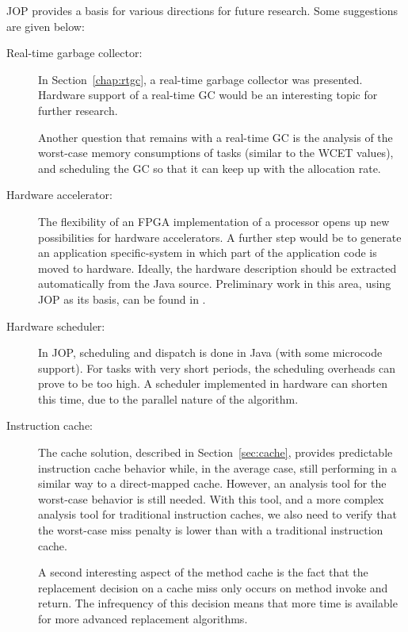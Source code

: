 JOP provides a basis for various directions for future research.
Some suggestions are given below:
%
\begin{description}
    \item[Real-time garbage collector:]
In Section~\ref{chap:rtgc}, a real-time garbage collector was
presented. Hardware support of a real-time GC would be an
interesting topic for further research.

Another question that remains with a real-time GC is the analysis of
the worst-case memory consumptions of tasks (similar to the WCET
values), and scheduling the GC so that it can keep up with the
allocation rate.

    \item[Hardware accelerator:] The flexibility of an FPGA
        implementation of a processor opens up new possibilities
        for hardware accelerators. A further step would be to
        generate an application specific-system in which part of
        the application code is moved to hardware. Ideally, the
        hardware description should be extracted automatically
        from the Java source. Preliminary work in this area,
        using JOP as its basis, can be found in \cite{jop:sac05,
        jop:hwmethods}.

    \item[Hardware scheduler:]
In JOP, scheduling and dispatch is done in Java (with some microcode
support). For tasks with very short periods, the scheduling
overheads can prove to be too high. A scheduler implemented in
hardware can shorten this time, due to the parallel nature of the
algorithm.



    \item[Instruction cache:] The cache solution, described in
        Section~\ref{sec:cache}, provides predictable instruction
        cache behavior while, in the average case, still
        performing in a similar way to a direct-mapped cache.
        However, an analysis tool for the worst-case behavior is
        still needed. With this tool, and a more complex analysis
        tool for traditional instruction caches, we also need to
        verify that the worst-case miss penalty is lower than
        with a traditional instruction cache.

A second interesting aspect of the method cache is the fact that
the replacement decision on a cache miss only occurs on method
invoke and return. The infrequency of this decision means that
more time is available for more advanced replacement algorithms.



\end{description}
